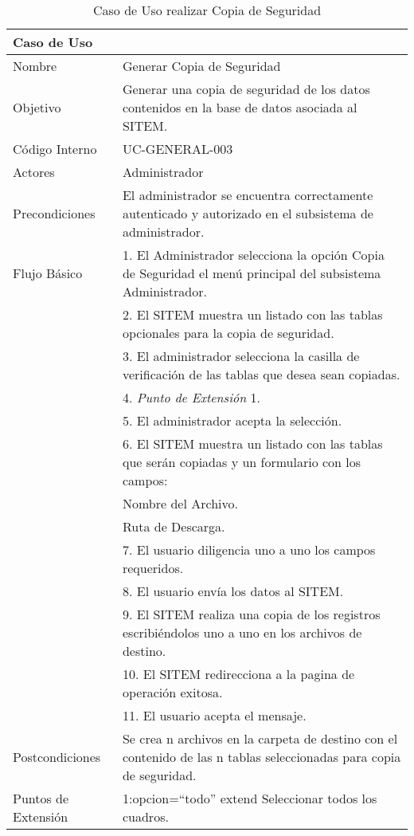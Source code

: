 \begin{table}
\begin{center}
\begin{tabular}{|l|p{10cm}|}
\hline
\textbf{Caso de Uso}&\\
\hline
Nombre & Generar Copia de Seguridad\\
\hline
Objetivo & Generar una copia de seguridad de los datos contenidos en la base de datos asociada al SITEM.\\
\hline
Código Interno & UC-GENERAL-003 \\
\hline
Actores & Administrador\\
\hline
Precondiciones & El administrador se encuentra correctamente autenticado y autorizado en el subsistema de administrador.\\
\hline
Flujo Básico & 1. El Administrador selecciona la opción Copia de Seguridad el menú principal del subsistema Administrador.\\
& 2. El SITEM muestra un listado con las tablas opcionales para la copia de seguridad.\\
& 3. El administrador selecciona la casilla de verificación de las tablas que desea sean copiadas.\\
& 4. \textit{Punto de Extensión} 1.\\
& 5. El administrador acepta la selección.\\
& 6. El SITEM muestra un listado con las tablas que serán copiadas y un formulario con los campos:\\
& Nombre del Archivo.\\
& Ruta de Descarga.\\
& 7. El usuario diligencia uno a uno los campos requeridos.\\
& 8. El usuario envía los datos al SITEM.\\
& 9. El SITEM realiza una copia de los registros escribiéndolos uno a uno en los archivos de destino.\\
& 10. El SITEM redirecciona a la pagina de operación exitosa.\\
& 11. El usuario acepta el mensaje.\\
\hline
Postcondiciones & Se crea n archivos en la carpeta de destino con el contenido de las n tablas seleccionadas para copia de seguridad.\\
\hline
Puntos de Extensión & 1:opcion=“todo” extend Seleccionar todos los cuadros.\\
\hline
\end{tabular}
\caption{Caso de Uso realizar Copia de Seguridad}
\label{casouso3} 
\end{center}
\end{table}

